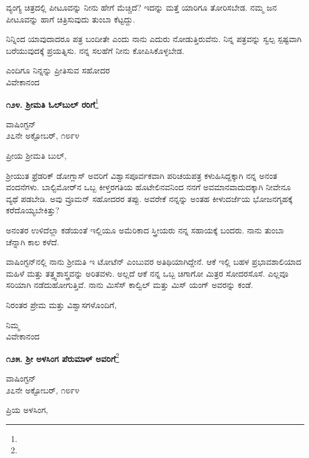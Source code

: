 ವ್ಯಂಗ್ಯ ಚಿತ್ರದಲ್ಲಿ ಪೀಟೂವನ್ನು ನೀನು ಹೇಗೆ ಮೆಚ್ಚಿದೆ? ಇದನ್ನು ಮತ್ತೆ ಯಾರಿಗೂ ತೋರಿಸಬೇಡ. ನಮ್ಮ ಜನ ಪೀಟೂವನ್ನು ಹಾಗೆ ಚಿತ್ರಿಸುವುದು ತುಂಬಾ ಕೆಟ್ಟದ್ದು.

ನಿನ್ನಿಂದ ಯಾವುದಾದರೂ ಪತ್ರ ಬಂದೀತೇ ಎಂದು ನಾನು ಎದುರು ನೋಡುತ್ತಿರುವೆನು. ನಿನ್ನ ಪತ್ರವನ್ನು ಸ್ವಲ್ಪ ಸ್ಪಷ್ಟವಾಗಿ ಬರೆಯುವುದಕ್ಕೆ ಪ್ರಯತ್ನಿಸು. ನನ್ನ ಸಲಹೆಗೆ ನೀನು ಕೋಪಿಸಿಕೊಳ್ಳಬೇಡ.

{\flushright
ಎಂದಿಗೂ ನಿನ್ನನ್ನು ಪ್ರೀತಿಸುವ ಸಹೋದರ\\ವಿವೇಕಾನಂದ\par}

\begin{center}
\textbf{೧೨೪. ಶ‍್ರೀಮತಿ ಓಲ್‌ಬುಲ್ ರರಿಗೆ}\footnote{}
\end{center}

\begin{flushright}
ವಾಷಿಂಗ್ಟನ್\\೨೭ನೇ ಅಕ್ಟೋಬರ್, ೧೮೯೪
\end{flushright}

\noindent
ಪ್ರೀಯ ಶ‍್ರೀಮತಿ ಬುಲ್,

ಶ‍್ರೀಯುತ ಫ್ರೆಡರಿಕ್ ಡೋಗ್ಲಾಸ್ ಅವರಿಗೆ ವಿಶ್ವಾಸಪೂರ್ವಕವಾಗಿ ಪರಿಚಯಪತ್ರ ಕಳುಹಿಸಿದ್ದಕ್ಕಾಗಿ ನನ್ನ ಅನಂತ ವಂದನೆಗಳು. ಬಾಲ್ಟಿಮೋರ್‌ನ ಒಬ್ಬ ಕೀಳ್ತರಗತಿಯ ಹೊಟೇಲಿನವನಿಂದ ನನಗೆ ಅವಮಾನವಾದುದಕ್ಕಾಗಿ ನೀವೇನೂ ವ್ಯಥೆ ಪಡಬೇಡಿ. ಅವು ವ್ರೂಮನ್ ಸಹೋದರರ ತಪ್ಪು. ಅವರೇಕೆ ನನ್ನನ್ನು ಅಂತಹ ಕೀಳುದರ್ಜೆಯ ಭೋಜನಗೃಹಕ್ಕೆ ಕರೆದೊಯ್ಯಬೇಕಿತ್ತು?

ಅನಂತರ ಉಳಿದೆಲ್ಲಾ ಕಡೆಯಂತೆ ಇಲ್ಲಿಯೂ ಅಮೆರಿಕಾದ ಸ್ತ್ರೀಯರು ನನ್ನ ಸಹಾಯಕ್ಕೆ ಬಂದರು. ನಾನು ತುಂಬಾ ಚೆನ್ನಾಗಿ ಕಾಲ ಕಳೆದೆ.

ವಾಷಿಂಗ್ಟನ್‌ನಲ್ಲಿ ನಾನು ಶ‍್ರೀಮತಿ ಇ ಟೋಟೆನ್ ಎಂಬುವರ ಅತಿಥಿಯಾಗಿದ್ದೇನೆ. ಆಕೆ ಇಲ್ಲಿ ಬಹಳ ಪ್ರಭಾವಶಾಲಿಯಾದ ಮಹಿಳೆ ಮತ್ತು ತತ್ತ್ವಶಾಸ್ತ್ರವನ್ನು ಅರಿತವಳು. ಅಲ್ಲದೆ ಆಕೆ ನನ್ನ ಒಬ್ಬ ಚಿಗಾಗೋ ಮಿತ್ರರ ಸೋದರಸೊಸೆ. ಎಲ್ಲವೂ ಸರಿಯಾಗಿ ನಡೆದುಹೋಗುತ್ತಿವೆ. ನಾನು ಮಿಸೆಸ್ ಕಾಲ್ವಿಲ್ ಮತ್ತು ಮಿಸ್ ಯಂಗ್ ಅವರನ್ನು ಕಂಡೆ.

ನಿರಂತರ ಪ್ರೇಮ ಮತ್ತು ವಿಶ್ವಾಸಗಳೊಂದಿಗೆ,

{\flushright
ನಿಮ್ಮ\\ವಿವೇಕಾನಂದ\par}

\newpage

\begin{center}
\textbf{೧೨೫. ಶ‍್ರೀ ಅಳಸಿಂಗ ಪೆರುಮಾಳ್ ಅವರಿಗೆ}\footnote{}
\end{center}

\begin{flushright}
ವಾಷಿಂಗ್ಟನ್\\೨೭ನೇ ಅಕ್ಟೋಬರ್, ೧೮೯೪
\end{flushright}

\noindent
ಪ್ರಿಯ ಅಳಸಿಂಗ,

